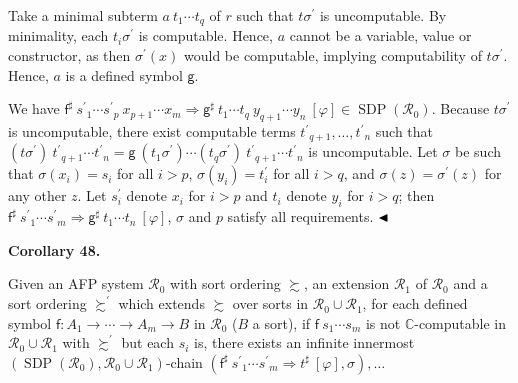 \documentclass[10pt,a4paper]{amsart}
\begin{document}
 
 
Take a minimal subterm ${a}\ {{t}_{1}\cdots{t}_{q}}$ of $r$ such that $t\sigma^{\prime}$ is uncomputable. By minimality, each $t_{i}\sigma^{\prime}$ is computable. Hence, $a$ cannot be a variable, value or constructor, as then $\sigma^{\prime}(x)$ would be computable, implying computability of $t\sigma^{\prime}$. Hence, $a$ is a defined symbol $\mathsf{g}$.\par
 
 
 
We have ${{{\mathsf{f}^{\sharp}}\ {{s^{\prime}}_{1}\cdots{s^{\prime}}_{p}}}\ {{x}_{p+1}\cdots{x}_{m}}}\Rightarrow{{{\mathsf{g}^{\sharp}}\ {{t}_{1}\cdots{t}_{q}}}\ {{y}_{q+1}\cdots{y}_{n}}}\ [\varphi]\in\operatorname{SDP}(\mathcal{R}_{0})$. Because $t\sigma^{\prime}$ is uncomputable, there exist computable terms ${t^{\prime}}_{q+1},\ldots,{t^{\prime}}_{n}$ such that ${(t\sigma^{\prime})}\ {{t^{\prime}}_{q+1}\cdots{t^{\prime}}_{n}}={{\mathsf{g}}\ {(t_{1}\sigma^{\prime})\cdots(t_{q}\sigma^{\prime})}}\ {{t^{\prime}}_{q+1}\cdots{t^{\prime}}_{n}}$ is uncomputable. Let $\sigma$ be such that $\sigma(x_{i})=s_{i}$ for all $i>p$, $\sigma(y_{i})=t_{i}^{\prime}$ for all $i>q$, and $\sigma(z)=\sigma^{\prime}(z)$ for any other $z$. Let $s_{i}^{\prime}$ denote $x_{i}$ for $i>p$ and $t_{i}$ denote $y_{i}$ for $i>q$; then ${{\mathsf{f}^{\sharp}}\ {{s^{\prime}}_{1}\cdots{s^{\prime}}_{m}}}\Rightarrow{{\mathsf{g}^{\sharp}}\ {{t}_{1}\cdots{t}_{n}}}\ [\varphi]$, $\sigma$ and $p$ satisfy all requirements. $\hfill\blacktriangleleft$\par
 
 
 
\par\medskip\noindent\textbf{Corollary 48.}\par
 
 
Given an AFP system $\mathcal{R}_{0}$ with sort ordering $\succsim$, an extension $\mathcal{R}_{1}$ of $\mathcal{R}_{0}$ and a sort ordering $\succsim^{\prime}$ which extends $\succsim$ over sorts in $\mathcal{R}_{0}\cup\mathcal{R}_{1}$, for each defined symbol $\mathsf{f}:{A}_{1}\rightarrow\cdots\rightarrow{A}_{m}\rightarrow B$ in $\mathcal{R}_{0}$ ($B$ a sort), if ${\mathsf{f}}\ {{s}_{1}\cdots{s}_{m}}$ is not $\mathbb{C}$-computable in $\mathcal{R}_{0}\cup\mathcal{R}_{1}$ with $\succsim^{\prime}$ but each $s_{i}$ is, there exists an infinite innermost $(\operatorname{SDP}(\mathcal{R}_{0}),\mathcal{R}_{0}\cup\mathcal{R}_{1})$-chain $({{\mathsf{f}^{\sharp}}\ {{s^{\prime}}_{1}\cdots{s^{\prime}}_{m}}}\Rightarrow{t^{\sharp}}\ [\varphi],\sigma),\ldots$\par
 
\end{document}
